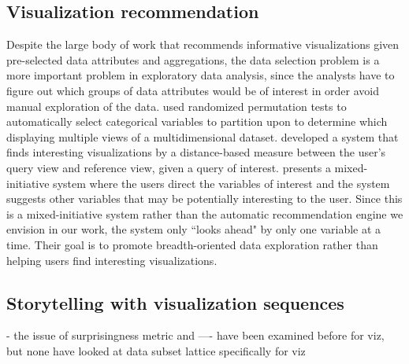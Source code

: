 \subsection{Visualization recommendation}
\par Despite the large body of work that recommends informative visualizations given pre-selected data attributes and aggregations, the data selection problem is a more important problem in exploratory data analysis, since the analysts have to figure out which groups of data attributes would be of interest in order avoid manual exploration of the data.  \cite{Anand2015} used randomized permutation tests to automatically select categorical variables to partition upon to determine which displaying multiple views of a multidimensional dataset. \cite{Vartak2015} developed a system that finds interesting visualizations by a distance-based measure between the user's query view and reference view,  given a query of interest.\cite{Wongsuphasawat2016} presents a mixed-initiative system where the users direct the variables of interest and the system suggests other variables that may be potentially interesting to the user. Since this is a mixed-initiative system rather than the automatic recommendation engine we envision in our work, the system only ``looks ahead"  by only one variable at a time. Their goal is to promote breadth-oriented data exploration rather than helping users find interesting visualizations.
\subsection{Storytelling with visualization sequences}
- the issue of surprisingness metric and ---- have been examined before for viz, but none have looked at data subset lattice specifically for viz